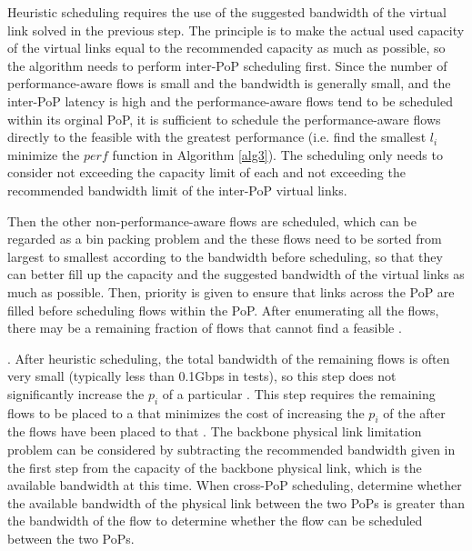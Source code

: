 
{ Heuristic scheduling requires the use of the suggested bandwidth of the virtual link solved in the previous step. The principle is to make the actual used capacity of the virtual links equal to the recommended capacity as much as possible, so the algorithm needs to perform inter-PoP scheduling first. Since the number of performance-aware flows is small and the bandwidth is generally small, and the inter-PoP latency is high and the performance-aware flows tend to be scheduled within its orginal PoP, it is sufficient to schedule the performance-aware flows directly to the feasible {\egress} with the greatest performance (i.e. find the smallest {\egress} $l_i$ minimize the $perf$ function in Algorithm \ref{alg3}). The scheduling only needs to consider not exceeding the capacity limit of each {\egress} and not exceeding the recommended bandwidth limit of the inter-PoP virtual links.}

{Then the other non-performance-aware flows are scheduled, which can be regarded as a bin packing problem and the these flows need to be sorted from largest to smallest according to the bandwidth before scheduling, so that they can better fill up the {\egress} capacity and the suggested bandwidth of the virtual links as much as possible. Then, priority is given to ensure that links across the PoP are filled before scheduling flows within the PoP. After enumerating all the flows, there may be a remaining fraction of flows that cannot find a feasible {\egress}.}

{. After heuristic scheduling, the total bandwidth of the remaining flows is often very small (typically less than 0.1Gbps in tests), so this step does not significantly increase the $p_i$ of a particular {\egress}. This step requires the remaining flows to be placed to a {\egress} that minimizes the cost of increasing the $p_i$ of the {\egress} after the flows have been placed to that {\egress}. The backbone physical link limitation problem can be considered by subtracting the recommended bandwidth given in the first step from the capacity of the backbone physical link, which is the available bandwidth at this time. When cross-PoP scheduling, determine whether the available bandwidth of the physical link between the two PoPs is greater than the bandwidth of the flow to determine whether the flow can be scheduled between the two PoPs.}



